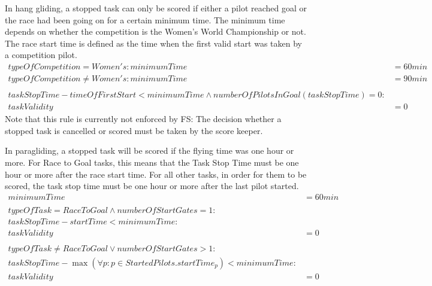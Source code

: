 \documentclass{article}
\begin{document}
\begin{hg}
In hang gliding, a stopped task can only be scored if either a pilot reached
goal or the race had been going on for a certain minimum time. The minimum time
depends on whether the competition is the Women’s World Championship or not.
The race start time is defined as the time when the first valid start was taken
by a competition pilot.
\begin{align*}
    typeOfCompetition = Women's : minimumTime &= 60min \\
    typeOfCompetition \neq Women's : minimumTime &= 90min \\
    \\
    taskStopTime - timeOfFirstStart < minimumTime \land numberOfPilotsInGoal(taskStopTime) = 0 : \\
    taskValidity &= 0
\end{align*}
Note that this rule is currently not enforced by FS: The decision whether
a stopped task is cancelled or scored must be taken by the score keeper.
\end{hg}

\begin{pg}
In paragliding, a stopped task will be scored if the flying time was one hour
or more. For Race to Goal tasks, this means that the Task Stop Time must be one
hour or more after the race start time. For all other tasks, in order for them
to be scored, the task stop time must be one hour or more after the last pilot
started.
\begin{align*}
    minimumTime &= 60min \\
    \\
    typeOfTask = RaceToGoal \land numberOfStartGates = 1 : \\
    taskStopTime - startTime < minimumTime : \\
    taskValidity &= 0 \\
    \\
    typeOfTask \neq RaceToGoal \lor numberOfStartGates > 1 : \\
    taskStopTime - \max(\forall p : p \in StartedPilots . startTime_p) < minimumTime : \\
    taskValidity &= 0
\end{align*}
\end{pg}
\end{document}

